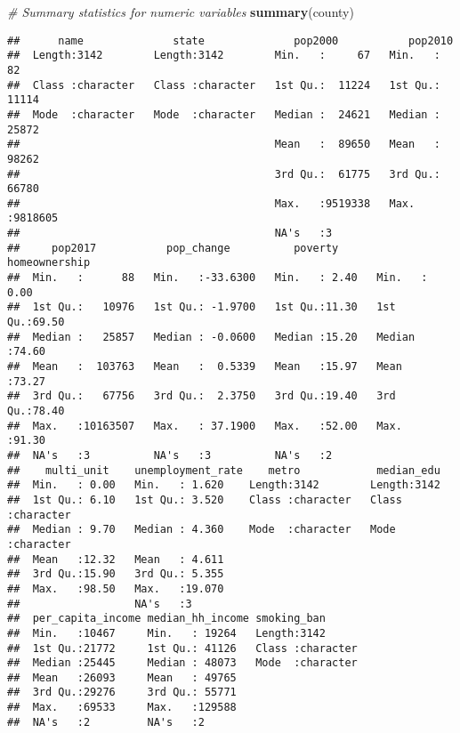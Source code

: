 \documentclass[
]{article}
\newenvironment{Shaded}{\begin{snugshade}}{\end{snugshade}}
\newcommand{\CommentTok}[1]{\textcolor[rgb]{0.56,0.35,0.01}{\textit{#1}}}
\newcommand{\FunctionTok}[1]{\textcolor[rgb]{0.13,0.29,0.53}{\textbf{#1}}}
\newcommand{\NormalTok}[1]{#1}
\begin{document}
\begin{Shaded}
\begin{Highlighting}[]
\CommentTok{\# Summary statistics for numeric variables}
\FunctionTok{summary}\NormalTok{(county)}
\end{Highlighting}
\end{Shaded}

\begin{verbatim}
##      name              state              pop2000           pop2010       
##  Length:3142        Length:3142        Min.   :     67   Min.   :     82  
##  Class :character   Class :character   1st Qu.:  11224   1st Qu.:  11114  
##  Mode  :character   Mode  :character   Median :  24621   Median :  25872  
##                                        Mean   :  89650   Mean   :  98262  
##                                        3rd Qu.:  61775   3rd Qu.:  66780  
##                                        Max.   :9519338   Max.   :9818605  
##                                        NA's   :3                          
##     pop2017           pop_change          poverty      homeownership  
##  Min.   :      88   Min.   :-33.6300   Min.   : 2.40   Min.   : 0.00  
##  1st Qu.:   10976   1st Qu.: -1.9700   1st Qu.:11.30   1st Qu.:69.50  
##  Median :   25857   Median : -0.0600   Median :15.20   Median :74.60  
##  Mean   :  103763   Mean   :  0.5339   Mean   :15.97   Mean   :73.27  
##  3rd Qu.:   67756   3rd Qu.:  2.3750   3rd Qu.:19.40   3rd Qu.:78.40  
##  Max.   :10163507   Max.   : 37.1900   Max.   :52.00   Max.   :91.30  
##  NA's   :3          NA's   :3          NA's   :2                      
##    multi_unit    unemployment_rate    metro            median_edu       
##  Min.   : 0.00   Min.   : 1.620    Length:3142        Length:3142       
##  1st Qu.: 6.10   1st Qu.: 3.520    Class :character   Class :character  
##  Median : 9.70   Median : 4.360    Mode  :character   Mode  :character  
##  Mean   :12.32   Mean   : 4.611                                         
##  3rd Qu.:15.90   3rd Qu.: 5.355                                         
##  Max.   :98.50   Max.   :19.070                                         
##                  NA's   :3                                              
##  per_capita_income median_hh_income smoking_ban       
##  Min.   :10467     Min.   : 19264   Length:3142       
##  1st Qu.:21772     1st Qu.: 41126   Class :character  
##  Median :25445     Median : 48073   Mode  :character  
##  Mean   :26093     Mean   : 49765                     
##  3rd Qu.:29276     3rd Qu.: 55771                     
##  Max.   :69533     Max.   :129588                     
##  NA's   :2         NA's   :2
\end{verbatim}
\end{document}
